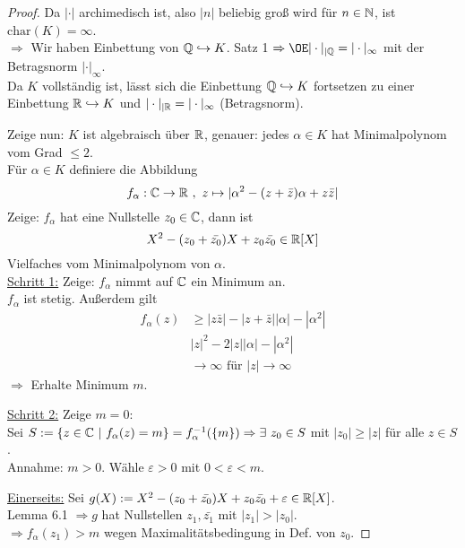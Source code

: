 \begin{proof}
Da $|\cdot|$ archimedisch ist, also $|n|$ beliebig groß wird für $n \in \mathbb{N}$, ist $\mathrm{char}(K)=\infty$.\\
$\Rightarrow$ Wir haben Einbettung von $\mathbb{Q} \hookrightarrow K$. Satz 1 $\Rightarrow \OE |\cdot|_{|\Q}=|\cdot|_\infty$ mit der Betragsnorm $|\cdot|_\infty$.\\
Da $K$ vollständig ist, lässt sich die Einbettung $\mathbb{Q} \hookrightarrow K$ fortsetzen zu einer Einbettung $\mathbb{R} \hookrightarrow K$ und $|\cdot|_{|\mathbb{R}}=|\cdot|_{\infty}$ (Betragsnorm).

Zeige nun: $K$ ist algebraisch über $\mathbb{R}$, genauer: jedes $\alpha \in K$ hat Minimalpolynom vom Grad $\leq 2$.\\
Für $\alpha \in K$ definiere die Abbildung
\[f_\alpha: \mathbb{C} \to \mathbb{R} \ , \ z \mapsto |\alpha^2-(z+\bar{z})\alpha +z\bar{z}|\]
Zeige: $f_\alpha$ hat eine Nullstelle $z_0 \in \mathbb{C}$, dann ist
\[X^2-(z_0+\bar{z_0})X+z_0\bar{z_0} \in \mathbb{R}[X]\]
Vielfaches vom Minimalpolynom von $\alpha$.\\
\underline{Schritt 1:} Zeige: $f_\alpha$ nimmt auf $\mathbb{C}$ ein Minimum an.\\
$f_\alpha$ ist stetig. Außerdem gilt
\begin{align*}
f_\alpha(z) &\geq |z\bar{z}|-|z+\bar{z}||\alpha|-|\alpha^2|\\
&|z|^2-2|z||\alpha|-|\alpha^2|\\
&\to \infty \text{ für } |z| \to \infty
\end{align*}
$\Rightarrow$ Erhalte Minimum $m$.

\underline{Schritt 2:} Zeige $m=0$:\\
Sei $S:=\{z \in \C \ | \ f_\alpha(z)=m\}=f_\alpha^{-1}(\{m\}) \Rightarrow \exists \ z_0 \in S$ mit $|z_0| \geq |z|$ für alle $z \in S$.\\
Annahme: $m >0$. Wähle $\varepsilon>0$ mit $0<\varepsilon<m$.

\underline{Einerseits:} Sei $g(X):=X^2-(z_0+\bar{z_0})X+z_0\bar{z_0}+\varepsilon \in \mathbb{R}[X]$.\\
Lemma 6.1 $\Rightarrow g$ hat Nullstellen $z_1, \bar{z_1}$ mit $|z_1|>|z_0|$.\\
$\Rightarrow f_\alpha(z_1) >m$ wegen Maximalitätsbedingung in Def. von $z_0$.


\end{proof}

